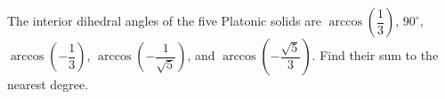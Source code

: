 The interior dihedral angles of the five Platonic solids are $\arccos(\dfrac{1}{3})$, $ 90^\circ $, $\arccos(-\dfrac{1}{3})$, $\arccos(-\dfrac{1}{\sqrt5})$, and $\arccos(-\dfrac{\sqrt5}{3})$. Find their sum to the nearest degree.

